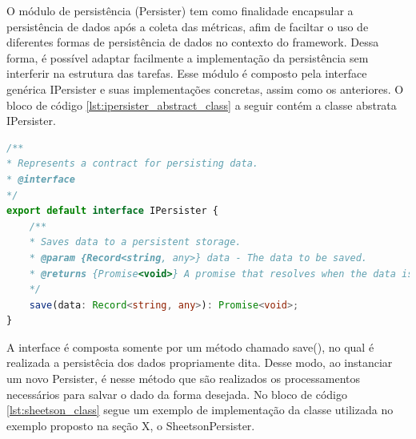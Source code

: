 \documentclass[12pt]{tcc}
\begin{document}
O módulo de persistência (Persister) tem como finalidade encapsular a persistência de dados após a coleta das métricas, afim de faciltar o uso de diferentes formas de persistência de dados no contexto do framework. Dessa forma, é possível adaptar facilmente a implementação da persistência sem interferir na estrutura das tarefas. Esse módulo é composto pela interface genérica IPersister e suas implementações concretas, assim como os anteriores. O bloco de código \ref{lst:ipersister_abstract_class} a seguir contém a classe abstrata IPersister.

\begin{lstlisting}[label={lst:ipersister_abstract_class}, caption={Implementação da classe responsável pela persistência dos dados.}, language=TypeScript, breaklines=true]
/**
* Represents a contract for persisting data.
* @interface
*/
export default interface IPersister {
	/**
	* Saves data to a persistent storage.
	* @param {Record<string, any>} data - The data to be saved.
	* @returns {Promise<void>} A promise that resolves when the data is saved.
	*/
	save(data: Record<string, any>): Promise<void>;
}
\end{lstlisting}

A interface é composta somente por um método chamado save(), no qual é realizada a persistêcia dos dados propriamente dita. Desse modo, ao instanciar um novo Persister, é nesse método que são realizados os processamentos necessários para salvar o dado da forma desejada. No bloco de código \ref{lst:sheetson_class} segue um exemplo de implementação da classe utilizada no exemplo proposto na seção X, o SheetsonPersister.
\end{document}

